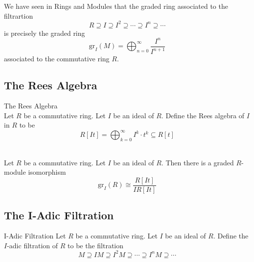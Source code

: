 \documentclass[a4paper]{article}
\begin{document}
We have seen in Rings and Modules that the graded ring associated to the filtrartion $$R\supseteq I\supseteq I^2\supseteq\cdots\supseteq I^n\supseteq\cdots$$ is precisely the graded ring $$\text{gr}_I(M)=\bigoplus_{n=0}^\infty\frac{I^n}{I^{n+1}}$$ associated to the commutative ring $R$. 

\subsection{The Rees Algebra}
\begin{defn}{The Rees Algebra}{}\\
Let $R$ be a commutative ring. Let $I$ be an ideal of $R$. Define the Rees algebra of $I$ in $R$ to be $$R[It]=\bigoplus_{k=0}^\infty I^k\cdot t^k\subseteq R[t]$$
\end{defn}

\begin{lmm}{}{}\\
Let $R$ be a commutative ring. Let $I$ be an ideal of $R$. Then there is a graded $R$-module isomorphism $$\text{gr}_I(R)\cong\frac{R[It]}{IR[It]}$$
\end{lmm}

\subsection{The I-Adic Filtration}
\begin{defn}{I-Adic Filtration}{} Let $R$ be a commutative ring. Let $I$ be an ideal of $R$. Define the $I$-adic filtration of $R$ to be the filtration $$M\supseteq IM\supseteq I^2M\supseteq\cdots\supseteq I^nM\supseteq\cdots$$
\end{defn}
\end{document}
